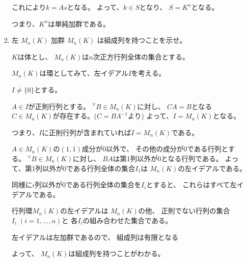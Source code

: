 \documentclass[12pt,b5paper]{ltjsarticle}
\begin{document}
\begin{enumerate}
      これにより$k = As$となる。
      よって、$k\in S$となり、
      $S=K^{n}$となる。

      つまり、$K^{n}$は単純加群である。

      \hrulefill

 \item
      左 $M_{n}(K)$ 加群 $M_{n}(K)$ は組成列を持つことを示せ。

      \dotfill

      $K$は体とし、
      $M_{n}(K)$は$n$次正方行列全体の集合とする。

      $M_{n}(K)$は環としてみて、左イデアル$I$を考える。

      $I\ne\{0\}$とする。

      $A\in I$が正則行列とする。
      ${}^{\forall}B\in M_{n}(K)$に対し、
      $CA=B$となる$C\in M_{n}(K)$が存在する。($C=BA^{-1}$より)
      よって、$I=M_{n}(K)$となる。

      つまり、$I$に正則行列が含まれていれば$I=M_{n}(K)$である。


      $A\in M_{n}(K)$の$(1,1)$成分が0以外で、
      その他の成分が0である行列とする。
      ${}^{\forall}B\in M_{n}(K)$に対し、
      $BA$は第1列以外が0となる行列である。
      よって、第1列以外が0である行列全体の集合$I_{1}$は
      $M_{n}(K)$の左イデアルである。

      同様に$i$列以外が0である行列全体の集合を$I_{i}$とすると、
      これらはすべて左イデアルである。

      行列環$M_{n}(K)$の左イデアルは
      $M_{n}(K)$の他、
      正則でない行列の集合$I_{i}\;(i=1,\dots,n)$と
      各$I_{i}$の組み合わせた集合である。

      左イデアルは左加群であるので、
      組成列は有限となる




      よって、
      $M_{n}(K)$は組成列を持つことがわかる。

      \hrulefill
\end{enumerate}

\hrulefill
\end{document}
